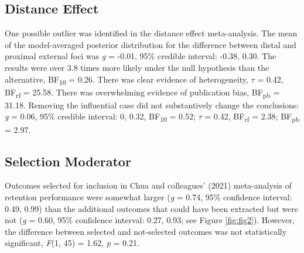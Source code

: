 \documentclass[man,floatsintext,letterpaper,12pt]{apa7}
\begin{document}
\subsection{Distance Effect}

One possible outlier \autocite{lohse2014-meta} was identified in the distance effect meta-analysis. The mean of the model-averaged posterior distribution for the difference between distal and proximal external foci was \emph{g} = -0.01, 95\% credible interval: -0.38, 0.30. The results were over 3.8 times more likely under the null hypothesis than the alternative, BF\textsubscript{10} = 0.26. There was clear evidence of heterogeneity, $\tau$ = 0.42, BF\textsubscript{rf} = 25.58. There was overwhelming evidence of publication bias, BF\textsubscript{pb} = 31.18. Removing the influential case did not substantively change the conclusions: \emph{g} = 0.06, 95\% credible interval: 0, 0.32, BF\textsubscript{10} = 0.52; $\tau$ = 0.42, BF\textsubscript{rf} = 2.38; BF\textsubscript{pb} = 2.97.

\subsection{Selection Moderator}

Outcomes selected for inclusion in Chua and colleagues' (2021) meta-analysis of retention performance were somewhat larger (\emph{g} = 0.74, 95\% confidence interval: 0.49, 0.99) than the additional outcomes that could have been extracted but were not (\emph{g} = 0.60, 95\% confidence interval: 0.27, 0.93; see Figure \ref{fig:fig2}). However, the difference between selected and not-selected outcomes was not statistically significant, \emph{F}(1, 45) = 1.62, \emph{p} = 0.21.

\clearpage
\end{document}
